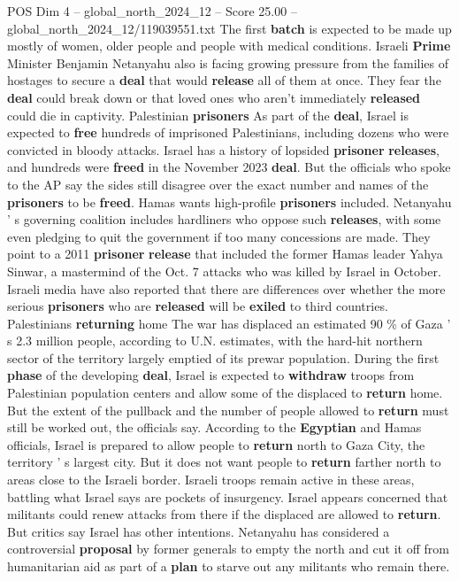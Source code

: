 \begin{textsample}{POS Dim 4 – global\_north\_2024\_12 – Score 25.00 – global\_north\_2024\_12/119039551.txt}
The first \textbf{batch} is expected to be made up mostly of women, older people and people with medical conditions.
Israeli \textbf{Prime} Minister Benjamin Netanyahu also is facing growing pressure from the families of hostages to secure a \textbf{deal} that would \textbf{release} all of them at once.
They fear the \textbf{deal} could break down or that loved ones who aren't immediately \textbf{released} could die in captivity.
Palestinian \textbf{prisoners} As part of the \textbf{deal}, Israel is expected to \textbf{free} hundreds of imprisoned Palestinians, including dozens who were convicted in bloody attacks.
Israel has a history of lopsided \textbf{prisoner} \textbf{releases}, and hundreds were \textbf{freed} in the November 2023 \textbf{deal}.
But the officials who spoke to the AP say the sides still disagree over the exact number and names of the \textbf{prisoners} to be \textbf{freed}.
Hamas wants high-profile \textbf{prisoners} included.
Netanyahu ' s governing coalition includes hardliners who oppose such \textbf{releases}, with some even pledging to quit the government if too many concessions are made.
They point to a 2011 \textbf{prisoner} \textbf{release} that included the former Hamas leader Yahya Sinwar, a mastermind of the Oct. 7 attacks who was killed by Israel in October.
Israeli media have also reported that there are differences over whether the more serious \textbf{prisoners} who are \textbf{released} will be \textbf{exiled} to third countries.
Palestinians \textbf{returning} home The war has displaced an estimated 90 \% of Gaza ' s 2.3 million people, according to U.N. estimates, with the hard-hit northern sector of the territory largely emptied of its prewar population.
During the first \textbf{phase} of the developing \textbf{deal}, Israel is expected to \textbf{withdraw} troops from Palestinian population centers and allow some of the displaced to \textbf{return} home.
But the extent of the pullback and the number of people allowed to \textbf{return} must still be worked out, the officials say.
According to the \textbf{Egyptian} and Hamas officials, Israel is prepared to allow people to \textbf{return} north to Gaza City, the territory ' s largest city.
But it does not want people to \textbf{return} farther north to areas close to the Israeli border.
Israeli troops remain active in these areas, battling what Israel says are pockets of insurgency.
Israel appears concerned that militants could renew attacks from there if the displaced are allowed to \textbf{return}.
But critics say Israel has other intentions.
Netanyahu has considered a controversial \textbf{proposal} by former generals to empty the north and cut it off from humanitarian aid as part of a \textbf{plan} to starve out any militants who remain there.

\end{textsample}
